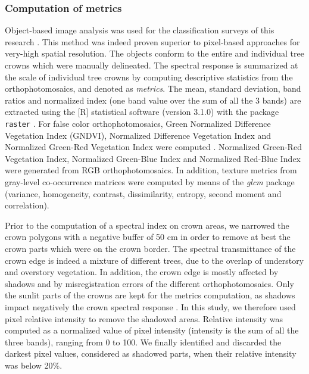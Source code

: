 \documentclass[remotesensing,article,submit,moreauthors,pdftex,12pt,a4paper]{mdpi} %
\begin{document}
\subsubsection{Computation of metrics}

Object-based image analysis was used for the classification surveys of this research \cite{blaschke_object_2010}. This method was indeed proven superior to pixel-based approaches for very-high spatial resolution. 
The objects conform to the entire and individual tree crowns which were manually delineated. 
The spectral response is summarized at the scale of individual tree crowns by computing descriptive statistics from the orthophotomosaics, and denoted as \textit{metrics}. 
The mean, standard deviation, band ratios and normalized index (one band value over the sum of all the 3 bands) are extracted using the [R] statistical software (version 3.1.0) with the package {\tt raster} \cite{etten_raster:_2014}. 
For false color orthophotomosaics, Green Normalized Difference Vegetation Index (GNDVI), Normalized Difference Vegetation Index and Normalized Green-Red Vegetation Index were computed \cite{sripada_aerial_2006,motohka_applicability_2010}. 
Normalized Green-Red Vegetation Index, Normalized Green-Blue Index and Normalized Red-Blue Index were generated from RGB orthophotomosaics. 
In addition, texture metrics from gray-level co-occurrence matrices were computed by means of the \textit{glcm} package (variance, homogeneity, contrast, dissimilarity, entropy, second moment and correlation).

Prior to the computation of a spectral index on crown areas, we narrowed the crown polygons with a negative buffer of 50 cm in order to remove at best the crown parts which were on the crown border. 
The spectral transmittance of the crown edge is indeed a mixture of different trees, due to the overlap of understory and overstory vegetation. 
In addition, the crown edge is mostly affected by shadows and by misregistration errors of the different orthophotomosaics.
Only the sunlit parts of the crowns are kept for the metrics computation, as shadows impact negatively the crown spectral response \cite{immitzer_tree_2012,heinzel_full_2008}. 
In this study, we therefore used pixel relative intensity to remove the shadowed areas.
Relative intensity was computed as a normalized value of pixel intensity (intensity is the sum of all the three bands), ranging from 0 to 100.
We finally identified and discarded the darkest pixel values, considered as shadowed parts, when their relative intensity was below 20\%. 
\end{document}
